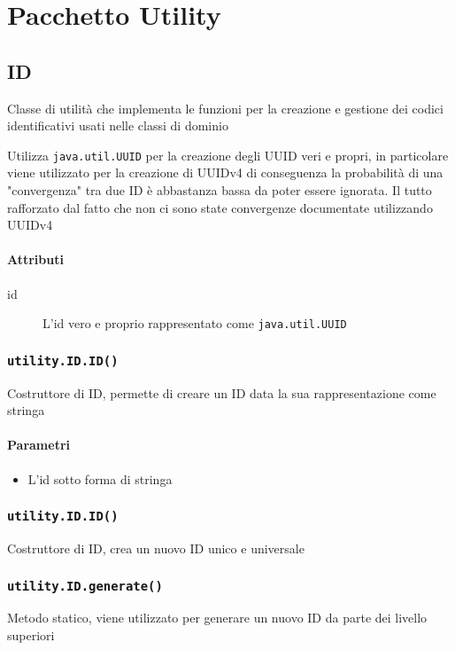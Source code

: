 \section{Pacchetto Utility}
\label{sec:package_utility}

\subsection{ID}
Classe di utilità che implementa le funzioni per la creazione e
gestione dei codici identificativi usati nelle classi di dominio

Utilizza \texttt{java.util.UUID} per la creazione degli UUID veri e
propri, in particolare viene utilizzato per la creazione di UUIDv4 di
conseguenza la probabilità di una "convergenza" tra due ID è
abbastanza bassa da poter essere ignorata. Il tutto rafforzato dal
fatto che non ci sono state convergenze documentate utilizzando UUIDv4

\paragraph{Attributi}
\begin{description}
\item[id] L'id vero e proprio rappresentato come \texttt{java.util.UUID}
\end{description}

\subsubsection{\texttt{utility.ID.ID()}}
Costruttore di ID, permette di creare un ID data la sua
rappresentazione come stringa
\paragraph{Parametri}
\begin{itemize}
\item L'id sotto forma di stringa
\end{itemize}

\subsubsection{\texttt{utility.ID.ID()}}
Costruttore di ID, crea un nuovo ID unico e universale

\subsubsection{\texttt{utility.ID.generate()}}
Metodo statico, viene utilizzato per generare un nuovo ID da parte
dei livello superiori
